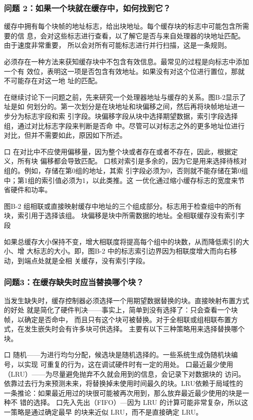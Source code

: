 \subsubsection{问题 2：如果一个块就在缓存中，如何找到它？}
缓存中拥有每个块帧的地址标志，给出块地址。每个缓存块的标志中可能包含所需要的信
息，会对这些标志进行查看，以了解它是否与来自处理器的块地址匹配。由于速度非常重要，
所以会对所有可能标志进行并行扫描，这是一条规则。

必须存在一种方法来获知缓存块中不包含有效信息。最常见的过程是向标志中添加一个有
效位，表明这一项是否包含有效地址。如果没有对这个位进行置位，那就不可能存在对这一地
址的匹配。

在继续讨论下一问题之前，先来研究一个处理器地址与缓存的关系。图B-2显示了址是如
何划分的。第一次划分是在块地址和块偏移之间，然后再将块帧地址进一步分为标志宇段和索
引字段。块偏移字段从块中选择期望数据，索引字段选择组，通过对比标志字段来判断是否命
中。尽管可以对标志之外的更多地址位进行对比，但并不需要如此，原因如下所述。

口 在对比中不应使用偏移量，因为整个块或者存在或者不存在，因此，根据定义，所有块
偏移都会导致匹配。
口核对索引是多余的，因为它是用来选择待核对组的。例如，存储在第0组的地址，其索
引字段必须为0，否则就不能存储在第0组中；第1组的索引值必须为1，以此类推。这
一优化通过缩小缓存标志的宽度来节省硬件和功率。

图B-2 组相联或直接映射缓存中地址的三个组成部分。标志用于检查组中的所有块，索引用于选择该组。
块偏移是块中所需数据的地址。全相联缓存没有索引字段

如果总缓存大小保持不变，增大相联度将提高每个组中的块数，从而降低索引的大小、增
大标志的大小。即，图B-2 中的标志索引边界因为相联度增大而向右移动，到端点处就是全相
关缓存，没有索引字段。

\subsubsection{问题3：在缓存缺失时应当替换哪个块？}
当发生缺失时，缓存控制器必须选择一个用期望数据替换的块。直接映射布置方式的好处
就是简化了硬件判决——事实上，简单到没有选择了：只会查看一个块帧，以确定是否命中，
而且只有这个块可被替换。对于全相联或组相联布置方式，在发生嵌失时会有许多块可供选择。
主要有以下三种策略用来选择替换哪个块。

口 随机——为进行均匀分配，候选块是随机选择的。一些系统生成伪随机块编号，以实现
可重复的行为，这在调试硬件时有一定的用处。
口最近最少使用（LRU）——为尽量避免抛弃不久就会用到的信息，会记录下对数据块的
访问。依靠过去行为来预测未来，将替换掉未使用时间最久的块。LRU依赖于局域性的
一条推论：如果最近用过的块很可能被再次用到，那么放弃最近最少使用的块是一种不
错的选择。
口先入先出（FIFO）—因为 LRU 的计算可能非常复杂，所以这一策略是通过确定最早
的块来近似 LRU，而不是直接确定 LRU。

